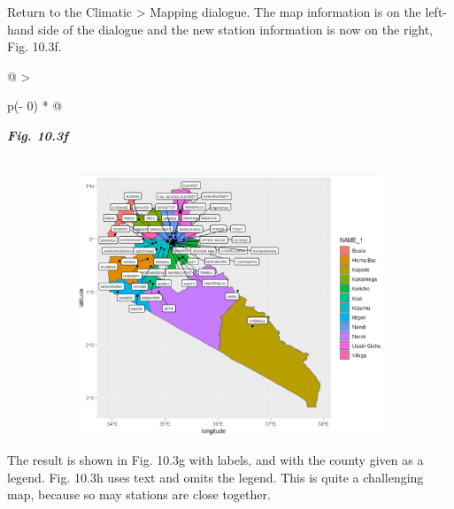 \documentclass[
  letterpaper,
  DIV=11,
  numbers=noendperiod]{scrreprt}
\begin{document}
Return to the Climatic \textgreater{} Mapping dialogue. The map
information is on the left-hand side of the dialogue and the new station
information is now on the right, Fig. 10.3f.

\begin{longtable}[]{@{}
  >{\raggedright\arraybackslash}p{(\columnwidth - 0\tabcolsep) * }@{}}
\toprule\noalign{}
\begin{minipage}[b]{\linewidth}\raggedright
\textbf{\emph{Fig. 10.3f}}
\end{minipage} \\
\midrule\noalign{}
\endhead
\bottomrule\noalign{}
\endlastfoot
\includegraphics[width=5.37815in,height=3.07816in]{figures/Fig10.3f.png} \\
\end{longtable}

The result is shown in Fig. 10.3g with labels, and with the county given
as a legend. Fig. 10.3h uses text and omits the legend. This is quite a
challenging map, because so may stations are close together.
\end{document}
